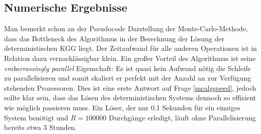\subsection{Numerische Ergebnisse}
Man bemerkt schon an der Pseudocode Darstellung der Monte-Carlo-Methode, dass das Bottleneck des Algorithmus in der Berechnung der Lösung der deterministischen KGG liegt. Der Zeitaufwand für alle anderen Operationen ist in Relation dazu vernachlässigbar klein. Ein großer Vorteil des Algorithmus ist seine \emph{embarrassingly parallel} Eigenschaft: Es ist quasi kein Aufwand nötig die Schleife zu parallelisieren und somit skaliert er perfekt mit der Anzahl an zur Verfügung stehenden Prozessoren. Dies ist eine erste Antwort auf Frage \ref{mcalgspeed}, jedoch sollte klar sein, dass das Lösen des deterministischen Systems dennoch so effizient wie möglich passieren muss. Ein Löser, der nur 0.1 Sekunden für ein einziges System benötigt und $R=100000$ Durchgänge erledigt, läuft ohne Parallelisierung bereits etwa 3 Stunden.\\
